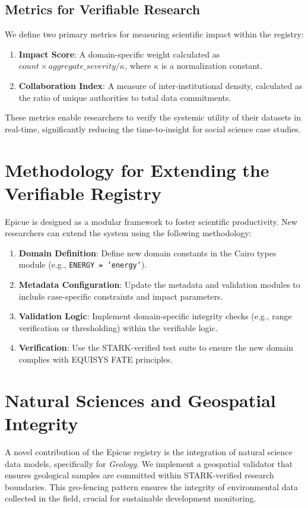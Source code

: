 \documentclass[12pt,a4paper]{article}
\begin{document}
\subsection{Metrics for Verifiable Research}
We define two primary metrics for measuring scientific impact within the registry:
\begin{enumerate}
    \item \textbf{Impact Score}: A domain-specific weight calculated as $\textit{count} \times \textit{aggregate\_severity} / \kappa$, where $\kappa$ is a normalization constant.
    \item \textbf{Collaboration Index}: A measure of inter-institutional density, calculated as the ratio of unique authorities to total data commitments.
\end{enumerate}
These metrics enable researchers to verify the systemic utility of their datasets in real-time, significantly reducing the time-to-insight for social science case studies.

\section{Methodology for Extending the Verifiable Registry}
Epicue is designed as a modular framework to foster scientific productivity. New researchers can extend the system using the following methodology:

\begin{enumerate}
    \item \textbf{Domain Definition}: Define new domain constants in the Cairo types module (e.g., \texttt{ENERGY = 'energy'}).
    \item \textbf{Metadata Configuration}: Update the metadata and validation modules to include case-specific constraints and impact parameters.
    \item \textbf{Validation Logic}: Implement domain-specific integrity checks (e.g., range verification or thresholding) within the verifiable logic.
    \item \textbf{Verification}: Use the STARK-verified test suite to ensure the new domain complies with EQUISYS FATE principles.
\end{enumerate}

\section{Natural Sciences and Geospatial Integrity}
A novel contribution of the Epicue registry is the integration of natural science data models, specifically for \textit{Geology}. We implement a geospatial validator that ensures geological samples are committed within STARK-verified research boundaries. This geo-fencing pattern ensures the integrity of environmental data collected in the field, crucial for sustainable development monitoring.
\end{document}
